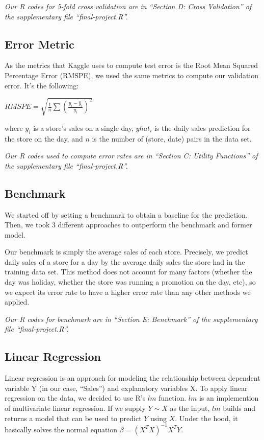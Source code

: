 \documentclass[letterpaper,twocolumn,11pt]{article}
\begin{document}
\textit{Our R codes for 5-fold cross validation are in ``Section D: Cross Validation'' of the supplementary file ``final-project.R''.}

\subsection{Error Metric}
As the metrics that Kaggle uses to compute test error is the Root Mean Squared Percentage Error (RMSPE), we used the same metrics to compute our validation error. It's the following:

$RMSPE = \sqrt{\frac{1}{n} \sum {(\frac{y_i - \hat y_i}{y_i})}^2}$

where ${y_i}$ is a store's sales on a single day, ${yhat_i}$ is the daily sales prediction for the store on the day, and ${n}$ is the number of (store, date) pairs in the data set.

\textit{Our R codes used to compute error rates are in ``Section C: Utility Functions'' of the supplementary file ``final-project.R''.}

\subsection{Benchmark}
We started off by setting a benchmark to obtain a baseline for the prediction. Then, we took 3 different approaches to outperform the benchmark and former model.

Our benchmark is simply the average sales of each store. Precisely, we predict daily sales of a store for a day by the average daily sales the store had in the training data set. This method does not account for many factors (whether the day was holiday, whether the store was running a promotion on the day, etc), so we expect its error rate to have a higher error rate than any other methods we applied.

\textit{Our R codes for benchmark are in ``Section E: Benchmark'' of the supplementary file ``final-project.R''.}

\subsection{Linear Regression}
Linear regression is an approach for modeling the relationship between dependent variable Y (in our case, ``Sales'') and explanatory variables X. To apply linear regression on the data, we decided to use R's $lm$ function. $lm$ is an implemention of multivariate linear regression. If we supply $Y \sim X$ as the input, $lm$ builds and returns a model that can be used to predict $Y$ using $X$. Under the hood, it basically solves the normal equation $\beta = (X^T X)^{-1} X^T Y$.
\end{document}

